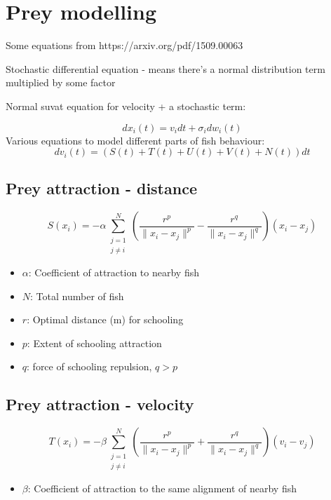 \section{Prey modelling}
Some equations from https://arxiv.org/pdf/1509.00063 \par
Stochastic differential equation - means there's a normal distribution term multiplied by some factor \par
Normal suvat equation for velocity + a stochastic term: \par
\begin{equation}
    dx_i(t) = v_idt +\sigma_i dw_i(t)
\end{equation}
Various equations to model different parts of fish behaviour:
\begin{equation}
        dv_i(t) =(S(t)+T(t) +U(t)+V(t)+N(t))dt
\end{equation}
\subsection{Prey attraction - distance}
\begin{equation}
    S(x_i)=- \alpha \sum_{\substack{j=1 \\ j \neq i}}^N \left( \frac{r^p}{\|x_i - x_j\|^p} - \frac{r^q}{\|x_i - x_j\|^q} \right)(x_i - x_j)
\end{equation}
\begin{itemize}
    \item $\alpha$: Coefficient of attraction to nearby fish
    \item $N$: Total number of fish
    \item $r$: Optimal distance (m) for schooling
    \item $p$: Extent of schooling attraction
    \item $q$: force of schooling repulsion, $q > p$
\end{itemize}
\subsection{Prey attraction - velocity}
\begin{equation}
    T(x_i)= - \beta \sum_{\substack{j=1 \\ j \neq i}}^N \left( \frac{r^p}{\|x_i - x_j\|^p} + \frac{r^q}{\|x_i - x_j\|^q}\right)(v_i - v_j) 
\end{equation}
\begin{itemize}
    \item $\beta$: Coefficient of attraction to the same alignment of nearby fish
\end{itemize}
